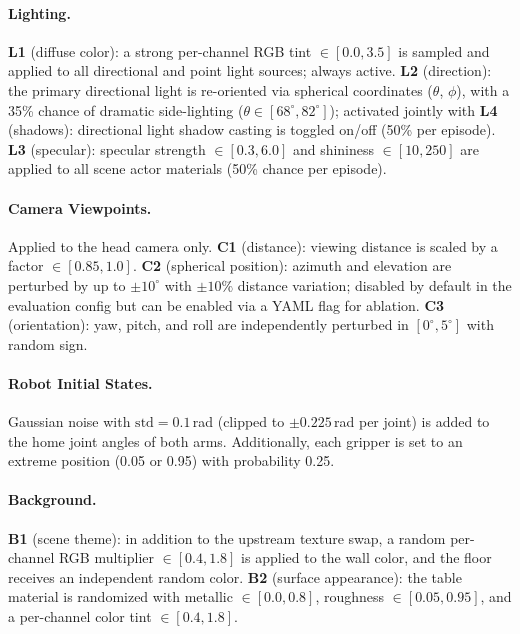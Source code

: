 \documentclass{article}
\begin{document}
\paragraph{Lighting.} \textbf{L1} (diffuse color): a strong per-channel RGB tint $\in [0.0, 3.5]$ is sampled and applied to all directional and point light sources; always active. \textbf{L2} (direction): the primary directional light is re-oriented via spherical coordinates ($\theta$, $\phi$), with a 35\% chance of dramatic side-lighting ($\theta \in [68^\circ, 82^\circ]$); activated jointly with \textbf{L4} (shadows): directional light shadow casting is toggled on/off (50\% per episode). \textbf{L3} (specular): specular strength $\in [0.3, 6.0]$ and shininess $\in [10, 250]$ are applied to all scene actor materials (50\% chance per episode).

\paragraph{Camera Viewpoints.} Applied to the head camera only. \textbf{C1} (distance): viewing distance is scaled by a factor $\in [0.85, 1.0]$. \textbf{C2} (spherical position): azimuth and elevation are perturbed by up to $\pm 10^\circ$ with $\pm 10\%$ distance variation; disabled by default in the evaluation config but can be enabled via a YAML flag for ablation. \textbf{C3} (orientation): yaw, pitch, and roll are independently perturbed in $[0^\circ, 5^\circ]$ with random sign.

\paragraph{Robot Initial States.} Gaussian noise with $\text{std}=0.1$\,rad (clipped to $\pm 0.225$\,rad per joint) is added to the home joint angles of both arms. Additionally, each gripper is set to an extreme position (0.05 or 0.95) with probability 0.25.

\paragraph{Background.} \textbf{B1} (scene theme): in addition to the upstream texture swap, a random per-channel RGB multiplier $\in [0.4, 1.8]$ is applied to the wall color, and the floor receives an independent random color. \textbf{B2} (surface appearance): the table material is randomized with metallic $\in [0.0, 0.8]$, roughness $\in [0.05, 0.95]$, and a per-channel color tint $\in [0.4, 1.8]$.
\end{document}

